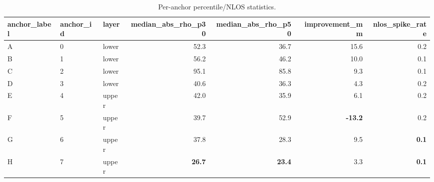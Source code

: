 \begin{table}[t]
\centering
\caption{Per-anchor percentile/NLOS statistics.}
\label{tab:nlos_per_anchor}
\begin{tabular}{lllrrrr}
\hline
anchor\_label & anchor\_id & layer & median\_abs\_rho\_p30 & median\_abs\_rho\_p50 & improvement\_mm & nlos\_spike\_rate \\
\hline
A & 0 & lower & 52.3 & 36.7 & 15.6 & 0.2 \\
B & 1 & lower & 56.2 & 46.2 & 10.0 & 0.1 \\
C & 2 & lower & 95.1 & 85.8 & 9.3 & 0.1 \\
D & 3 & lower & 40.6 & 36.3 & 4.3 & 0.2 \\
E & 4 & upper & 42.0 & 35.9 & 6.1 & 0.2 \\
F & 5 & upper & 39.7 & 52.9 & \textbf{-13.2} & 0.2 \\
G & 6 & upper & 37.8 & 28.3 & 9.5 & \textbf{0.1} \\
H & 7 & upper & \textbf{26.7} & \textbf{23.4} & 3.3 & \textbf{0.1} \\
\hline
\end{tabular}
\end{table}
